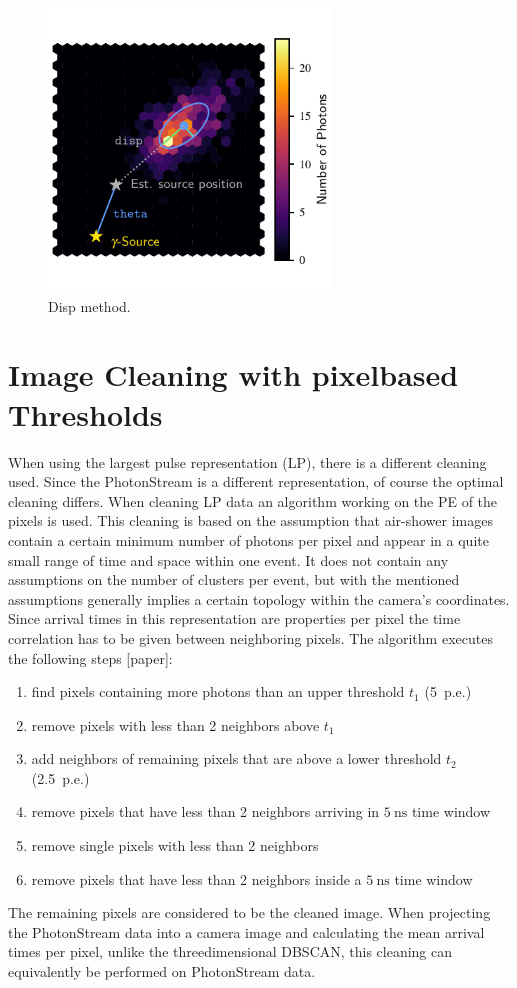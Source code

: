 %
\begin{figure}
  \centering%
  \includegraphics[width=0.67\textwidth]{Plots/hillas_disp.pdf}%
  \caption{Disp method.}%
  \label{fig:disp}%
\end{figure}
%
\section{Image Cleaning with pixelbased Thresholds}
%
When using the largest pulse representation (LP), there is a different cleaning
used. Since the PhotonStream is a different representation, of course the
optimal cleaning differs. When cleaning LP data an algorithm working on the PE
of the pixels is used. This cleaning is based on the assumption that air-shower
images contain a certain minimum number of photons per pixel and appear in a
quite small range of time and space within one event. It does not contain any
assumptions on the number of clusters per event, but with the mentioned
assumptions generally implies a certain topology within the camera's
coordinates. Since arrival times in this representation are properties per
pixel the time correlation has to be given between neighboring pixels. The
algorithm executes the following steps [paper]:
%
\begin{enumerate}
  \item find pixels containing more photons than an upper threshold $t_1$ (5~p.e.)
  \item remove pixels with less than 2 neighbors above $t_1$
  \item add neighbors of remaining pixels that are above a lower threshold $t_2$ (2.5~p.e.)
  \item remove pixels that have less than 2 neighbors arriving in $\SI{5}{\nano\second}$ time window
  \item remove single pixels with less than 2 neighbors
  \item remove pixels that have less than 2 neighbors inside a $\SI{5}{\nano\second}$ time window
\end{enumerate}
%
The remaining pixels are considered to be the cleaned image. When projecting
the PhotonStream data into a camera image and calculating the mean arrival
times per pixel, unlike the threedimensional DBSCAN, this cleaning can
equivalently be performed on PhotonStream data.


